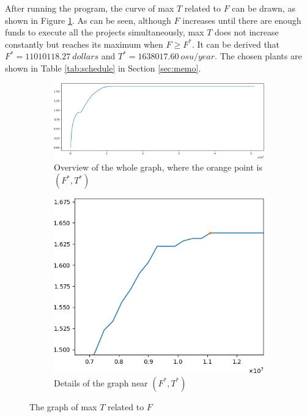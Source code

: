 \documentclass{article}
\begin{document}
After running the program, the curve of max $T$ related to $F$ can be drawn,
as shown in Figure \ref{fig:max T funds}.
As can be seen, although $F$ increases until there are enough funds to execute all the projects simultaneously,
max $T$ does not increase constantly but reaches its maximum when $F\ge F^*$.
It can be derived that $F^*=\SI{11010118.27}{dollars}$ and $T^*=\SI{1638017.60}{osu/year}$.
The chosen plants are shown in Table \ref{tab:schedule} in Section \ref{sec:memo}.

\begin{figure}[h!]
\centering
\begin{subfigure}[b]{\linewidth}
\includegraphics[width=\linewidth]{max_time_efficiency_with_funds.png}
\caption{Overview of the whole graph, where the orange point is $\left(F^*,T^*\right)$}
\end{subfigure}
\begin{subfigure}[b]{0.45\linewidth}
\includegraphics[width=\linewidth]{max_time_efficiency_with_funds_detail.png}
\caption{Details of the graph near $\left(F^*,T^*\right)$}
\end{subfigure}
\caption{The graph of max $T$ related to $F$}
\label{fig:max T funds}
\end{figure}
\end{document}
